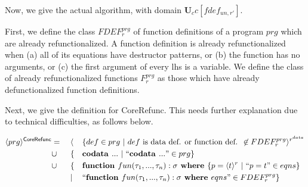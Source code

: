 Now, we give the actual algorithm, with domain $\mathbf{U}_cc[fdef_{un,r'}]$.

\begin{algorithm}

First, we define the class $FDEF^{prg}_r$ of function definitions of a program $prg$ which are already refunctionalized. A function definition is already refunctionalized when (a) all of its equations have destructor patterns, or (b) the function has no arguments, or (c) the first argument of every lhs is a variable. We define the class of already refunctionalized functions $F^{prg}_r$ as those which have already defunctionalized function definitions.

Next, we give the definition for \textsf{CoreRefunc}. This needs further explanation due to technical difficulties, as follows below.

\begin{alignat*}{3}
\langle prg \rangle^{\textsf{CoreRefunc}} & = ~&& \langle && \{ def \in prg ~ | ~ def \textrm{ is data def. or function def. } \not\in FDEF^{prg}_r \rangle^{r^{data}} \\
& \cup && \{ && \textrm{\textbf{codata }} ... ~ | ~ `` \textrm{\textbf{codata }} ... " \in prg \} \\
& \cup && \{ && \textrm{\textbf{function }} fun(\tau_1, ..., \tau_n): \sigma \textrm{\textbf{ where }} \{ p = \langle t \rangle^r ~ | ~ ``p = t" \in eqns \} \\
& && | && `` \textrm{\textbf{function }} fun(\tau_1, ..., \tau_n): \sigma \textrm{\textbf{ where }} eqns " \in FDEF^{prg}_r \} 
\end{alignat*}


\end{algorithm}
